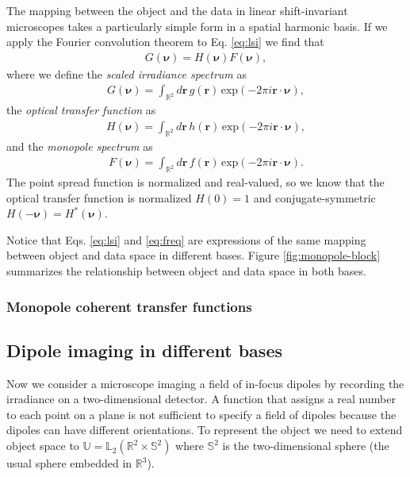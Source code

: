 \documentclass[]{osa-article}
\providecommand{\mb}[1]{\mathbf{#1}}
\providecommand{\mbb}[1]{\mathbb{#1}}
\providecommand{\bs}[1]{\boldsymbol{#1}}
\begin{document}
The mapping between the object and the data in linear shift-invariant
microscopes takes a particularly simple form in a spatial harmonic basis. If we
apply the Fourier convolution theorem to Eq. \ref{eq:lsi} we find that
\begin{align}
  G(\bs{\nu}) = H(\bs{\nu})F(\bs{\nu}),\label{eq:freq}
\end{align}
where we define the \textit{scaled irradiance spectrum} as
\begin{align}
  G(\bs{\nu}) = \int_{\mbb{R}^2}d\mb{r}\, g(\mb{r})\, \text{exp}(-2\pi i\mb{r}\cdot\bs{\nu}),
\end{align}
the \textit{optical transfer function} as
\begin{align}
  H(\bs{\nu}) = \int_{\mbb{R}^2}d\mb{r}\, h(\mb{r})\, \text{exp}(-2\pi i\mb{r}\cdot\bs{\nu}),\label{eq:otf}
\end{align}
and the \textit{monopole spectrum} as
\begin{align}
    F(\bs{\nu}) = \int_{\mbb{R}^2}d\mb{r}\, f(\mb{r})\, \text{exp}(-2\pi i\mb{r}\cdot\bs{\nu}).
\end{align}
The point spread function is normalized and real-valued, so we know that the
optical transfer function is normalized $H(0) = 1$ and conjugate-symmetric
$H(-\bs{\nu}) = H^*(\bs{\nu})$.

Notice that Eqs. \ref{eq:lsi} and \ref{eq:freq} are expressions of the same
mapping between object and data space in different bases. Figure
\ref{fig:monopole-block} summarizes the relationship between object and data
space in both bases.

\subsubsection{Monopole coherent transfer functions}

\subsection{Dipole imaging in different bases}\label{sec:dipole}
Now we consider a microscope imaging a field of in-focus dipoles by recording
the irradiance on a two-dimensional detector. A function that assigns a real
number to each point on a plane is not sufficient to specify a field of dipoles
because the dipoles can have different orientations. To represent the object we
need to extend object space to $\mbb{U} = \mbb{L}_2(\mbb{R}^2\times\mbb{S}^2)$
where $\mbb{S}^2$ is the two-dimensional sphere (the usual sphere embedded in
$\mbb{R}^3$).
\end{document}
